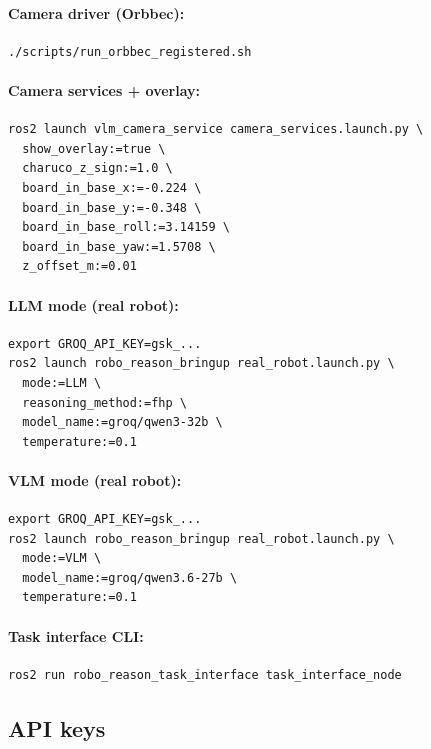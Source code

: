 \paragraph{Camera driver (Orbbec):}
\begin{lstlisting}
./scripts/run_orbbec_registered.sh
\end{lstlisting}

\paragraph{Camera services + overlay:}
\begin{lstlisting}
ros2 launch vlm_camera_service camera_services.launch.py \
  show_overlay:=true \
  charuco_z_sign:=1.0 \
  board_in_base_x:=-0.224 \
  board_in_base_y:=-0.348 \
  board_in_base_roll:=3.14159 \
  board_in_base_yaw:=1.5708 \
  z_offset_m:=0.01
\end{lstlisting}

\paragraph{LLM mode (real robot):}
\begin{lstlisting}
export GROQ_API_KEY=gsk_...
ros2 launch robo_reason_bringup real_robot.launch.py \
  mode:=LLM \
  reasoning_method:=fhp \
  model_name:=groq/qwen3-32b \
  temperature:=0.1
\end{lstlisting}

\paragraph{VLM mode (real robot):}
\begin{lstlisting}
export GROQ_API_KEY=gsk_...
ros2 launch robo_reason_bringup real_robot.launch.py \
  mode:=VLM \
  model_name:=groq/qwen3.6-27b \
  temperature:=0.1
\end{lstlisting}

\paragraph{Task interface CLI:}
\begin{lstlisting}
ros2 run robo_reason_task_interface task_interface_node
\end{lstlisting}

\subsection{API keys}

